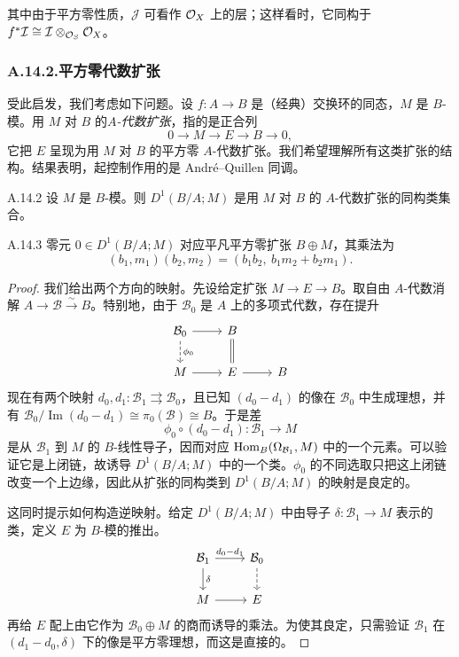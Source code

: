 其中由于平方零性质，$\mathcal J$ 可看作 $\mathcal{O}_X$ 上的层；这样看时，它同构于 $f^*\mathcal I\cong\mathcal I\otimes_{\mathcal{O}_S}\mathcal{O}_X$。

\subsubsection*{A.14.2.\quad 平方零代数扩张}

受此启发，我们考虑如下问题。设 $f\colon A\to B$ 是（经典）交换环的同态，$M$ 是 $B$-模。用 $M$ 对 $B$ 的\emph{$A$-代数扩张}，指的是正合列
\[
0\to M\to E\to B\to 0,
\]
它把 $E$ 呈现为用 $M$ 对 $B$ 的平方零 $A$-代数扩张。我们希望理解所有这类扩张的结构。结果表明，起控制作用的是 André--Quillen 同调。

\begin{prop}{A.14.2}\label{thm:a6-08-1}
设 $M$ 是 $B$-模。则 $D^1(B/A;M)$ 是用 $M$ 对 $B$ 的 $A$-代数扩张的同构类集合。
\end{prop}

\begin{exam}{A.14.3}\label{thm:a6-08-2}
零元 $0\in D^1(B/A;M)$ 对应平凡平方零扩张 $B\oplus M$，其乘法为
\[
(b_1,m_1)(b_2,m_2)=(b_1b_2,\ b_1m_2+b_2m_1).
\]
\end{exam}

\begin{proof}
我们给出两个方向的映射。先设给定扩张 $M\to E\to B$。取自由 $A$-代数消解 $A\to\mathcal B\xrightarrow{\sim}B$。特别地，由于 $\mathcal B_0$ 是 $A$ 上的多项式代数，存在提升
\[
\begin{tikzcd}
\mathcal B_0 \arrow[r] \arrow[d, dashed, "\phi_0"] & B \arrow[d, equal] \\
M \arrow[r] & E \arrow[r] & B
\end{tikzcd}
\]
现在有两个映射 $d_0,d_1\colon\mathcal B_1\rightrightarrows\mathcal B_0$，且已知 $(d_0-d_1)$ 的像在 $\mathcal B_0$ 中生成理想，并有 $\mathcal B_0/\operatorname{Im}(d_0-d_1)\cong\pi_0(\mathcal B)\cong B$。于是差
\[
\phi_0\circ(d_0-d_1)\colon\mathcal B_1\to M
\]
是从 $\mathcal B_1$ 到 $M$ 的 $B$-线性导子，因而对应 $\operatorname{Hom}_B(\Omega_{\mathcal B_1},M)$ 中的一个元素。可以验证它是上闭链，故诱导 $D^1(B/A;M)$ 中的一个类。$\phi_0$ 的不同选取只把这上闭链改变一个上边缘，因此从扩张的同构类到 $D^1(B/A;M)$ 的映射是良定的。

这同时提示如何构造逆映射。给定 $D^1(B/A;M)$ 中由导子 $\delta\colon\mathcal B_1\to M$ 表示的类，定义 $E$ 为 $B$-模的推出。
\[
\begin{tikzcd}
\mathcal B_1 \arrow[r, "d_0-d_1"] \arrow[d, "\delta"] & \mathcal B_0 \arrow[d, dashed] \\
M \arrow[r] & E
\end{tikzcd}
\]
再给 $E$ 配上由它作为 $\mathcal B_0\oplus M$ 的商而诱导的乘法。为使其良定，只需验证 $\mathcal B_1$ 在 $(d_1-d_0,\delta)$ 下的像是平方零理想，而这是直接的。
\end{proof}

